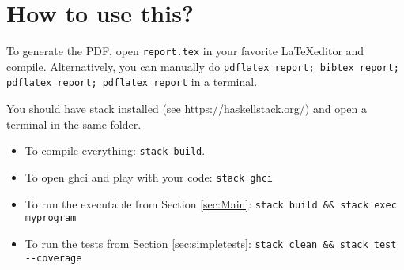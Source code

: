 
\section{How to use this?}

To generate the PDF, open \texttt{report.tex} in your favorite \LaTeX editor and compile.
Alternatively, you can manually do
\texttt{pdflatex report; bibtex report; pdflatex report; pdflatex report} in a terminal.

You should have stack installed (see \url{https://haskellstack.org/}) and
open a terminal in the same folder.

\begin{itemize}
  \item To compile everything: \verb|stack build|.
  \item To open ghci and play with your code: \verb|stack ghci|
  \item To run the executable from Section \ref{sec:Main}: \verb|stack build && stack exec myprogram|
  \item To run the tests from Section \ref{sec:simpletests}: \verb|stack clean && stack test --coverage|
\end{itemize}
